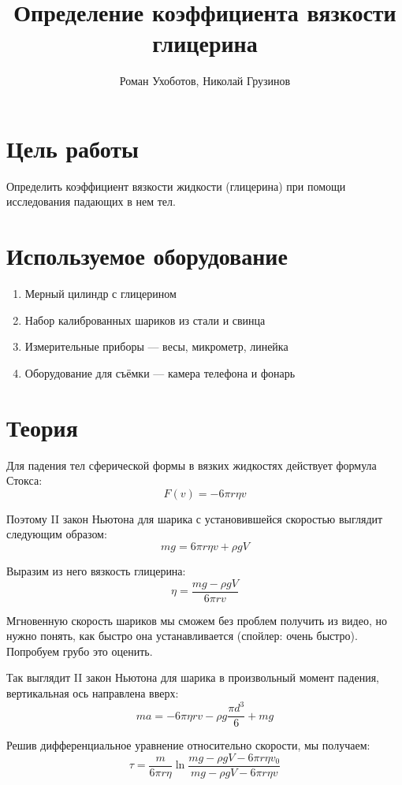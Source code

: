\documentclass[a4paper, 12pt]{article}
\title{Определение коэффициента вязкости глицерина}
\author{Роман Ухоботов, Николай Грузинов}
\date{}%
\begin{document}
    \maketitle


    \section{Цель работы}\label{sec:target}
    Определить коэффициент вязкости жидкости (глицерина) при помощи исследования падающих в нем тел.


    \section{Используемое оборудование}\label{sec:tools}
    \begin{enumerate}
        \item Мерный цилиндр с глицерином
        \item Набор калиброванных шариков из стали и свинца
        \item Измерительные приборы --- весы, микрометр, линейка
        \item Оборудование для съёмки --- камера телефона и фонарь
    \end{enumerate}


    \section{Теория}\label{sec:theory}

    Для падения тел сферической формы в вязких жидкостях действует формула Стокса:
    \[F(v) = -6 \pi r \eta v\]

    Поэтому II закон Ньютона для шарика с установившейся скоростью выглядит следующим образом:
    \[m g = 6 \pi r \eta v + \rho g V\]

    Выразим из него вязкость глицерина:
    \[ \eta = \frac{m g - \rho g V}{6 \pi r v} \]

    Мгновенную скорость шариков мы сможем без проблем получить из видео, но нужно понять,
    как быстро она устанавливается (спойлер: очень быстро).
    Попробуем грубо это оценить.

    Так выглядит II закон Ньютона для шарика в произвольный момент падения, вертикальная ось направлена вверх:
    \[ ma = - 6 \pi \eta r v - \rho g \frac{\pi d^3}{6} + mg \]

    Решив дифференциальное уравнение относительно скорости, мы получаем:
    \[ \tau = \frac{m}{6\pi r\eta}\ln \frac{mg - \rho gV - 6\pi r\eta v_0}{mg - \rho gV - 6\pi r\eta v} \]
\end{document}

